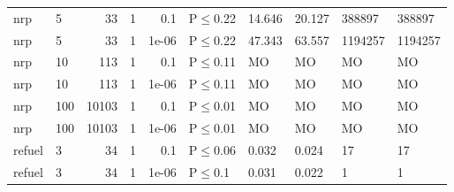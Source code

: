 \begin{longtable}{llrrrlllll}
 nrp           & 5         &     	33 & 1 & 0.1   & P$\leq$0.22  & 14.646 & 20.127 & 388897  & 388897  \\
 nrp           & 5         &     	33 & 1 & 1e-06 & P$\leq$0.22  & 47.343 & 63.557 & 1194257 & 1194257 \\
 nrp           & 10        &    	113 & 1 & 0.1   & P$\leq$0.11  & MO     & MO     & MO      & MO      \\
 nrp           & 10        &    	113 & 1 & 1e-06 & P$\leq$0.11  & MO     & MO     & MO      & MO      \\
 nrp           & 100       &  	10103 & 1 & 0.1   & P$\leq$0.01  & MO     & MO     & MO      & MO      \\
 nrp           & 100       &  	10103 & 1 & 1e-06 & P$\leq$0.01  & MO     & MO     & MO      & MO      \\
 refuel        & 3         &     	34 & 1 & 0.1   & P$\leq$0.06  & 0.032  & 0.024  & 17      & 17      \\
 refuel        & 3         &     	34 & 1 & 1e-06 & P$\leq$0.1   & 0.031  & 0.022  & 1       & 1       \\
\bottomrule
\end{longtable}
